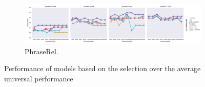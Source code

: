 \begin{figure}
  \begin{subfigure}[t]{\textwidth}
    \includegraphics[width=\textwidth]{supplement/figures/universal-results-phraserel}
    \caption{PhraseRel.}
    \label{fig:universal-results-phraserel}
  \end{subfigure}


  \caption{Performance of models based on the selection over the average universal performance}
  \label{fig:universal-results}
\end{figure}

